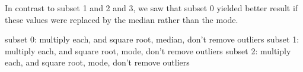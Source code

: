 \documentclass[10pt,conference,compsocconf]{IEEEtran}
\begin{document}
\begin{comment}
  \multirow{3}{*}{83.40\%} \\ \cline{1-4}
\multicolumn{1}{|l|}{PRI\_jet\_1}    & 1e-13      & 11      & mode     &               &               &                &                &               &              \\ \cline{1-4}
\multicolumn{1}{|l|}{PRI\_jet\_2\_3} & 1e-16      & 11      & mode     &               &               &                &                &               &              \\ \hline
\end{tabular}%
}
\caption{Parameters, F1-score and accuracy results.}
\label{tab:3_models}
\end{table}
\end{comment}


In contrast to subset 1 and 2 and 3, we saw that subset 0 yielded better 
result if these values were replaced by the median rather than the mode.

subset 0: multiply each, and square root, median, don't remove outliers
subset 1: multiply each, and square root, mode, don't remove outliers
subset 2: multiply each, and square root, mode, don't remove outliers
\end{document}
